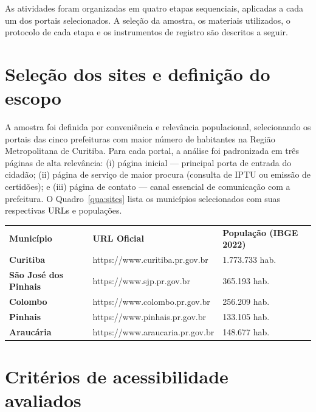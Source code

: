 \documentclass[brazil]{ifpr-pinhais}
\begin{document}
As atividades foram organizadas em quatro etapas sequenciais, aplicadas a cada um dos portais selecionados. A seleção da amostra, os materiais utilizados, o protocolo de cada etapa e os instrumentos de registro são descritos a seguir.

\section{Seleção dos sites e definição do escopo}

A amostra foi definida por conveniência e relevância populacional, selecionando os portais das cinco prefeituras com maior número de habitantes na Região Metropolitana de Curitiba. Para cada portal, a análise foi padronizada em três páginas de alta relevância: (i) página inicial --- principal porta de entrada do cidadão; (ii) página de serviço de maior procura (consulta de IPTU ou emissão de certidões); e (iii) página de contato --- canal essencial de comunicação com a prefeitura. O Quadro~\ref{qua:sites} lista os municípios selecionados com suas respectivas URLs e populações.

\begin{quadro}[htb]
\caption{Sites eletrônicos oficiais selecionados para análise}
\label{qua:sites}
\begin{tabular}{>{\bfseries}p{3.5cm} p{6cm} p{3.5cm}}
\rowcolor{headerblue}
\color{white}\textbf{Município} & \color{white}\textbf{URL Oficial} & \color{white}\textbf{População (IBGE 2022)} \\
Curitiba             & https://www.curitiba.pr.gov.br  & 1.773.733 hab. \\
São José dos Pinhais & https://www.sjp.pr.gov.br       & 365.193 hab.   \\
Colombo              & https://www.colombo.pr.gov.br   & 256.209 hab.   \\
Pinhais              & https://www.pinhais.pr.gov.br   & 133.105 hab.   \\
Araucária            & https://www.araucaria.pr.gov.br & 148.677 hab.   \\
\end{tabular}
\end{quadro}

\section{Critérios de acessibilidade avaliados}
\end{document}
